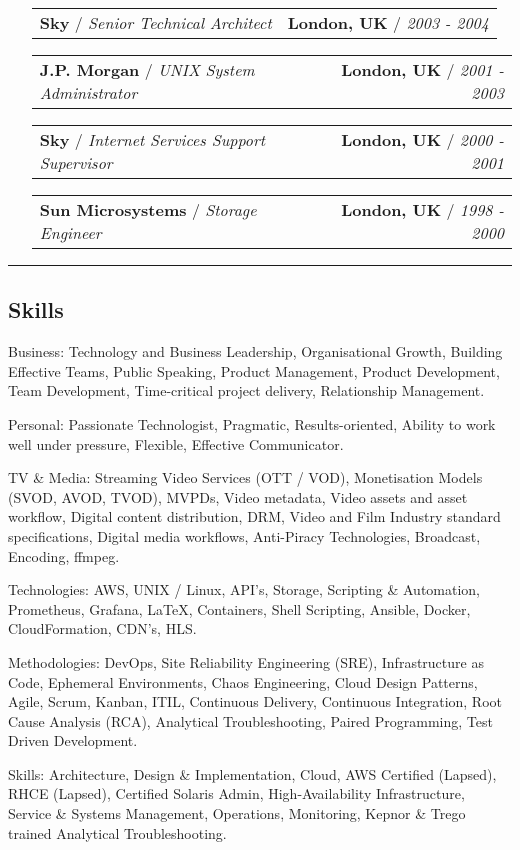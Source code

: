 \documentclass[10pt,a4paper]{article}
\makeatletter
\newenvironment{indentsection}[1]%
{\begin{list}{}%
	{\setlength{\leftmargin}{#1}}%
	\item[]%
}
{\end{list}}
\newcommand{\headerrow}[2]
{\begin{tabular*}{\linewidth}{l@{\extracolsep{\fill}}r}
	#1 &
	#2 \\
\end{tabular*}}
\makeatother
\begin{document}
\begin{itemize}
	\item[]
	\headerrow
    {\textbf{Sky} / \emph{Senior Technical Architect}}
    {\textbf{London, UK} / \emph{2003 - 2004}}

	\item[]
	\headerrow
    {\textbf{J.P. Morgan} / \emph{UNIX System Administrator}}
    {\textbf{London, UK} / \emph{2001 - 2003}}

	\item[]
	\headerrow
    {\textbf{Sky} / \emph{Internet Services Support Supervisor}}
    {\textbf{London, UK} / \emph{2000 - 2001}}

	\item[]
	\headerrow
    {\textbf{Sun Microsystems} / \emph{Storage Engineer}}
    {\textbf{London, UK} / \emph{1998 - 2000}}

\end{itemize}


\hrule
\vspace{-0.4em}
\subsection*{Skills}

\begin{indentsection}{\parindent}
\begin{description*}
		\item[Business:]
		Technology and Business Leadership, Organisational Growth, Building Effective Teams, Public Speaking, Product Management, Product Development, Team Development, Time-critical project delivery, Relationship Management.
    \item[Personal:]
		Passionate Technologist, Pragmatic, Results-oriented, Ability to work well under pressure, Flexible, Effective Communicator.
    \item[TV \& Media:]
    Streaming Video Services (OTT / VOD), Monetisation Models (SVOD, AVOD, TVOD), MVPDs, Video metadata, Video assets and asset workflow, Digital content distribution, DRM, Video and Film Industry standard specifications, Digital media workflows, Anti-Piracy Technologies, Broadcast, Encoding, ffmpeg.
    \item[Technologies:]
    AWS, UNIX / Linux, API's, Storage, Scripting \& Automation, Prometheus, Grafana, \LaTeX, Containers, Shell Scripting, Ansible, Docker, CloudFormation, CDN's, HLS.
    \item[Methodologies:]
    DevOps, Site Reliability Engineering (SRE), Infrastructure as Code, Ephemeral Environments, Chaos Engineering, Cloud Design Patterns, Agile, Scrum, Kanban, ITIL, Continuous Delivery, Continuous Integration, Root Cause Analysis (RCA), Analytical Troubleshooting, Paired Programming, Test Driven Development.
    \item[Skills:]
    Architecture, Design \& Implementation, Cloud, AWS Certified (Lapsed), RHCE (Lapsed), Certified Solaris Admin, High-Availability Infrastructure, Service \& Systems Management, Operations, Monitoring, Kepnor \& Trego trained Analytical Troubleshooting.

\end{description*}
\end{indentsection}
\end{document}
